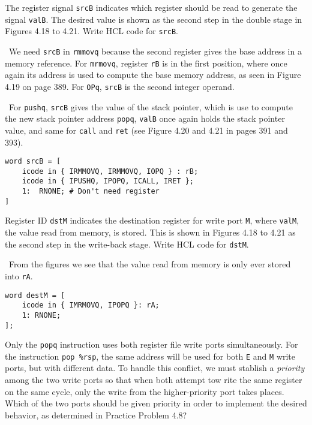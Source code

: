 \documentclass[12pt]{article}
\newenvironment{ex}[2][Exercise]{\begin{trivlist}
		\item[\hskip \labelsep {\bfseries #1}\hskip \labelsep {\bfseries #2.}]}{\end{trivlist}}
\newenvironment{sol}[1][Solution]{\begin{trivlist}
		\item[\hskip \labelsep {\bfseries #1:}]}{\end{trivlist}}
\begin{document}
\begin{ex}{4.20}
	The register signal \texttt{srcB}  indicates which register should be read
	to generate the signal \texttt{valB}. The desired value is shown as the second
	step in the double stage in Figures 4.18 to 4.21. Write HCL code for \texttt{srcB}.
\end{ex}

\begin{sol}
	\
	We need \texttt{srcB} in \texttt{rmmovq} because the second register gives the
	base address in a memory reference. For \texttt{mrmovq}, register \texttt{rB}
	is in the first position, where once again its address is used to compute the
	base memory address, as seen in Figure 4.19 on page 389.
	For \texttt{OPq}, \texttt{srcB} is the second integer operand.
	
	\
	For \texttt{pushq}, \texttt{srcB} gives the value of the stack pointer,
	which is use to compute the new stack pointer address \texttt{popq},
	\texttt{valB} once again holds the stack pointer value, and
	same for \texttt{call}  and \texttt{ret} (see Figure 4.20 and 4.21
	in pages 391 and 393).
	\begin{lstlisting}[language={}]
word srcB = [
	icode in { IRMMOVQ, IRMMOVQ, IOPQ } : rB;
	icode in { IPUSHQ, IPOPQ, ICALL, IRET };
	1:  RNONE; # Don't need register
]
	\end{lstlisting}
\end{sol}

\begin{ex}{4.21}
	Register ID \texttt{dstM} indicates the destination register for write port
	\texttt{M}, where \texttt{valM}, the value read from memory, is stored. This is shown in Figures 4.18 to 4.21 as the second step in the write-back stage. Write
	HCL code for \texttt{dstM}.
\end{ex}

\begin{sol}
	\
	From the figures we see that the value read from memory is only ever stored
	into \texttt{rA}.
	\begin{lstlisting}[language={}]
word destM = [
	icode in { IMRMOVQ, IPOPQ }: rA;
	1: RNONE;
];
	\end{lstlisting}
\end{sol}

\begin{ex}{4.22}
	Only the \texttt{popq} instruction uses both register file write ports
	simultaneously. For the instruction \texttt{pop \%rsp}, the same address
	will be used for both \texttt{E} and \texttt{M} write ports, but with
	different data. To handle this conflict, we must stablish a \emph{priority}
	among the two write ports so that when both attempt tow rite the same register
	on the same cycle, only the write from the higher-priority port takes places.
	Which of the two ports should be given priority in order to implement the
	desired behavior, as determined in Practice Problem 4.8?
\end{ex}
\end{document}
